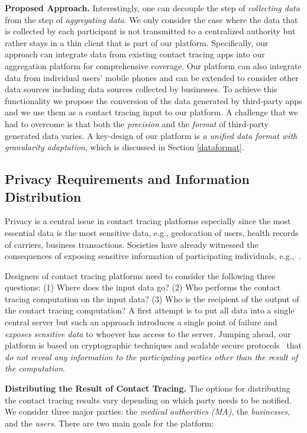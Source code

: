 \textbf{Proposed Approach.} Interestingly, one can decouple the step of \emph{collecting data} from the step of \emph{aggregating data}. 
We only consider the case where the data that is collected by each participant is not transmitted to a centralized authority but rather stays in a thin client that is part of our platform. 
Specifically, our approach can integrate data from existing contact tracing apps into our aggregation platform for comprehensive coverage. 
Our platform can also integrate data from individual users' mobile phones and can be extended to consider other data sources including data sources collected by businesses. To achieve this functionality we propose the conversion of the data generated by third-party apps and we use them as a contact tracing input to our platform. A challenge that we had to overcome is that both the \emph{precision} and the \emph{format} of third-party generated data varies.
A key-design of our platform is \emph{a unified data format with granularity adaptation}, which is discussed in Section \ref{dataformat}.

\subsection{Privacy Requirements and Information Distribution}
\label{options}
Privacy is a central issue in contact tracing platforms especially since the most essential data is the most sensitive data, e.g., geolocation of users, health records of carriers, business transactions. 
Societies have already witnessed the consequences of exposing sensitive information of participating individuals, e.g.,~\cite{south-korea-privacy}. 

Designers of contact tracing platforms need to consider the following three questions: (1) Where does the input data go? (2) Who performs the contact tracing computation on the input data? (3) Who is the recipient of the output of the contact tracing computation?
A first attempt is to put all data into a single central server but such an approach introduces a single point of failure and  \emph{exposes sensitive data} to whoever has access to the server. 
Jumping ahead, our platform is based on cryptographic techniques and scalable secure protocols~\cite{pet18, Kales2019, SOda19} that \emph{do not reveal any information to the participating parties other than the result of the computation}.

\textbf{Distributing the Result of Contact Tracing.} %
The options for distributing the contact tracing results vary depending on which party needs to be notified. 
We consider three major parties: the \emph{medical authorities (MA)}, the \emph{businesses}, and the \emph{users}. There are two main goals for the \sysname platform:  

